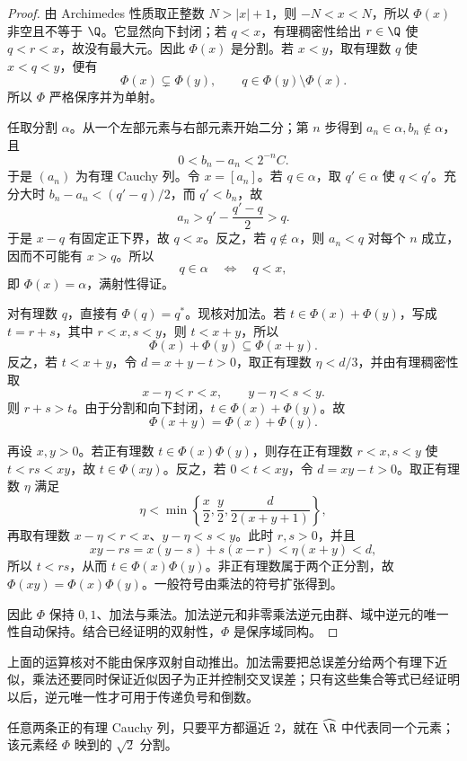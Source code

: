 \begin{proof}
由 Archimedes 性质取正整数 \(N>|x|+1\)，则 \(-N<x<N\)，所以 \(\Phi(x)\) 非空且不等于 \(\Q\)。它显然向下封闭；若 \(q<x\)，有理稠密性给出 \(r\in\Q\) 使 \(q<r<x\)，故没有最大元。因此 \(\Phi(x)\) 是分割。若 \(x<y\)，取有理数 \(q\) 使 \(x<q<y\)，便有
\[
 \Phi(x)\subsetneq\Phi(y),\qquad q\in\Phi(y)\setminus\Phi(x).
\]
所以 \(\Phi\) 严格保序并为单射。

任取分割 \(\alpha\)。从一个左部元素与右部元素开始二分；第 \(n\) 步得到 \(a_n\in\alpha,b_n\notin\alpha\)，且
\[
 0<b_n-a_n<2^{-n}C.
\]
于是 \((a_n)\) 为有理 Cauchy 列。令 \(x=[a_n]\)。若 \(q\in\alpha\)，取 \(q'\in\alpha\) 使 \(q<q'\)。充分大时 \(b_n-a_n<(q'-q)/2\)，而 \(q'<b_n\)，故
\[
  a_n>q'-\frac{q'-q}{2}>q.
\]
于是 \(x-q\) 有固定正下界，故 \(q<x\)。反之，若 \(q\notin\alpha\)，则 \(a_n<q\) 对每个 \(n\) 成立，因而不可能有 \(x>q\)。所以
\[
  q\in\alpha\quad\Longleftrightarrow\quad q<x,
\]
即 \(\Phi(x)=\alpha\)，满射性得证。

对有理数 \(q\)，直接有 \(\Phi(q)=q^*\)。现核对加法。若 \(t\in\Phi(x)+\Phi(y)\)，写成 \(t=r+s\)，其中 \(r<x,s<y\)，则 \(t<x+y\)，所以
\[
 \Phi(x)+\Phi(y)\subseteq\Phi(x+y).
\]
反之，若 \(t<x+y\)，令 \(d=x+y-t>0\)，取正有理数 \(\eta<d/3\)，并由有理稠密性取
\[
 x-\eta<r<x,\qquad y-\eta<s<y.
\]
则 \(r+s>t\)。由于分割和向下封闭，\(t\in\Phi(x)+\Phi(y)\)。故
\[
 \Phi(x+y)=\Phi(x)+\Phi(y).
\]

再设 \(x,y>0\)。若正有理数 \(t\in\Phi(x)\Phi(y)\)，则存在正有理数 \(r<x,s<y\) 使 \(t<rs<xy\)，故 \(t\in\Phi(xy)\)。反之，若 \(0<t<xy\)，令 \(d=xy-t>0\)。取正有理数 \(\eta\) 满足
\[
 \eta<\min\left\{\frac{x}{2},\frac{y}{2},
 \frac{d}{2(x+y+1)}\right\},
\]
再取有理数 \(x-\eta<r<x\)、\(y-\eta<s<y\)。此时 \(r,s>0\)，并且
\[
 xy-rs=x(y-s)+s(x-r)<\eta(x+y)<d,
\]
所以 \(t<rs\)，从而 \(t\in\Phi(x)\Phi(y)\)。非正有理数属于两个正分割，故 \(\Phi(xy)=\Phi(x)\Phi(y)\)。一般符号由乘法的符号扩张得到。

因此 \(\Phi\) 保持 \(0,1\)、加法与乘法。加法逆元和非零乘法逆元由群、域中逆元的唯一性自动保持。结合已经证明的双射性，\(\Phi\) 是保序域同构。
\end{proof}

上面的运算核对不能由保序双射自动推出。加法需要把总误差分给两个有理下近似，乘法还要同时保证近似因子为正并控制交叉误差；只有这些集合等式已经证明以后，逆元唯一性才可用于传递负号和倒数。

\begin{corollary}
任意两条正的有理 Cauchy 列，只要平方都逼近 \(2\)，就在 \(\widehat{\R}\) 中代表同一个元素；该元素经 \(\Phi\) 映到的 \(\sqrt2\) 分割。
\end{corollary}

